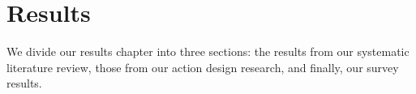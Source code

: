 \chapter{Results}
\label{chapter:Results}

We divide our results chapter into three sections: the results from our systematic literature review, those from our action design research, and finally, our survey results.


\newpage

\newpage
